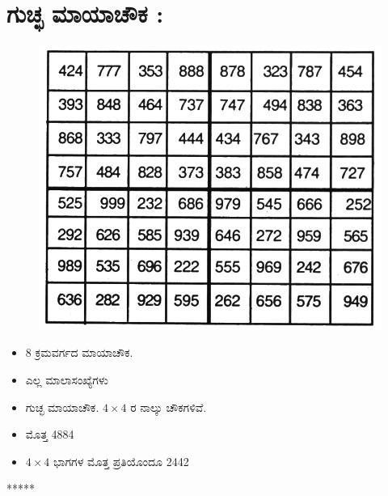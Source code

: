 \section*{ಗುಚ್ಛ ಮಾಯಾಚೌಕ :}

\begin{figure}[H]
\includegraphics{src/figures/chap5/fig5-15.jpg}
\end{figure}

\begin{itemize}
	\item 8 ಕ್ರಮವರ್ಗದ ಮಾಯಾಚೌಕ.
	\item ಎಲ್ಲ ಮಾಲಾಸಂಖ್ಯೆಗಳು
	\item ಗುಚ್ಛ ಮಾಯಾಚೌಕ. $4 \times 4$ ರ ನಾಲ್ಕು ಚೌಕಗಳಿವೆ.
	\item ಮೊತ್ತ 4884
	\item $4 \times 4$ ಭಾಗಗಳ ಮೊತ್ತ ಪ್ರತಿಯೊಂದೂ 2442
\end{itemize}
\begin{center}
*****
\end{center}
